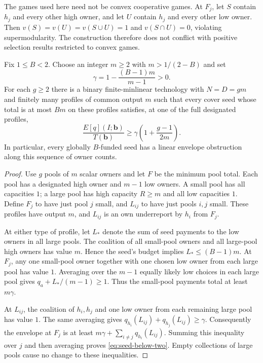 \begin{remark}
The games used here need not be convex cooperative games.  At $F_j$, let
$S$ contain $h_j$ and every other high owner, and let $U$ contain $h_j$
and every other low owner.  Then $v(S)=v(U)=v(S\cup U)=1$ and
$v(S\cap U)=0$, violating supermodularity.  The construction therefore
does not conflict with positive selection results restricted to convex
games.
\end{remark}

\begin{theorem}
\label{thm:seed-barrier}
Fix $1\le B<2$.  Choose an integer $m\ge2$ with $m>1/(2-B)$ and set
\[
 \gamma=1-\frac{(B-1)m}{m-1}>0.
\]
For each $g\ge2$ there is a binary finite-minlinear technology with
$N=D=gm$ and finitely many profiles of common output $m$ such that every
cover seed whose total is at most $Bm$ on these profiles satisfies, at
one of the full designated profiles,
\begin{equation}
 \frac{E[q](I;\mathbf b)}{T(\mathbf b)}
 \ge \gamma\left(1+\frac{g-1}{2m}\right).
 \label{eq:seed-below-two}
\end{equation}
In particular, every globally $B$-funded seed has a linear envelope
obstruction along this sequence of owner counts.
\end{theorem}
\begin{proof}
Use $g$ pools of $m$ scalar owners and let $F$ be the minimum pool total.
Each pool has a designated high owner and $m-1$ low owners.  A small pool
has all capacities $1$; a large pool has high capacity $R\ge m$ and all
low capacities $1$.  Define $F_j$ to have just pool $j$ small, and
$L_{ij}$ to have just pools $i,j$ small.  These profiles have output $m$,
and $L_{ij}$ is an own underreport by $h_i$ from $F_j$.

At either type of profile, let $L_*$ denote the sum of seed payments to
the low owners in all large pools.  The coalition of all small-pool
owners and all large-pool high owners has value $m$.  Hence the seed's
budget implies $L_*\le(B-1)m$.  At $F_j$, any one small-pool owner together
with one chosen low owner from each large pool has value $1$.  Averaging
over the $m-1$ equally likely low choices in each large pool gives
$q_a+L_* /(m-1)\ge1$.  Thus the small-pool payments total at least
$m\gamma$.

At $L_{ij}$, the coalition of $h_i,h_j$ and one low owner from each
remaining large pool has value $1$.  The same averaging gives
$q_{h_i}(L_{ij})+q_{h_j}(L_{ij})\ge\gamma$.
Consequently the envelope at $F_j$ is at least
$m\gamma+\sum_{i\ne j}q_{h_i}(L_{ij})$.  Summing this inequality over
$j$ and then averaging proves \eqref{eq:seed-below-two}.  Empty collections
of large pools cause no change to these inequalities.
\end{proof}

